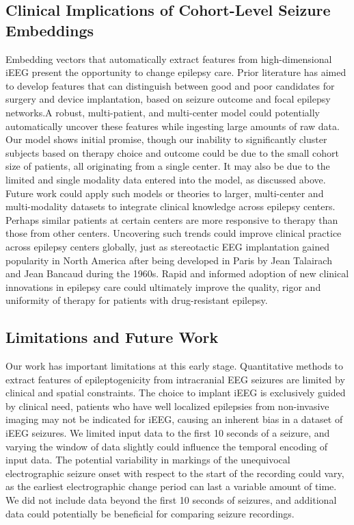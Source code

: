 \documentclass[11pt]{article}
\begin{document}
\subsection*{Clinical Implications of Cohort-Level Seizure Embeddings}
Embedding vectors that automatically extract features from high-dimensional iEEG present the opportunity to change epilepsy care. Prior literature has aimed to develop features that can distinguish between good and poor candidates for surgery and device implantation, based on seizure outcome and focal epilepsy networks\cite{Gallagher2023Quantifying,Bernabei2022Normative, Jaber2024spatial, Sinha2017Predicting,Li2021Neural, ScheidIntracranial, Khambhati2021Long}.A robust, multi-patient, and multi-center model could potentially automatically uncover these features while ingesting large amounts of raw data\cite{Bernabei2023Quantitative,Litt2022Engineers}. Our model shows initial promise, though our inability to significantly cluster subjects based on therapy choice and outcome could be due to the small cohort size of patients, all originating from a single center. It may also be due to the limited and single modality data entered into the model, as discussed above. Future work could apply such models or theories to larger, multi-center and multi-modality datasets to integrate clinical knowledge across epilepsy centers. Perhaps similar patients at certain centers are more responsive to therapy than those from other centers. Uncovering such trends could improve clinical practice across epilepsy centers globally, just as stereotactic EEG implantation gained popularity in North America after being developed in Paris by Jean Talairach and Jean Bancaud during the 1960s\cite{Youngerman2019Stereoelectroencephalography}. Rapid and informed adoption of new clinical innovations in epilepsy care could ultimately improve the quality, rigor and uniformity of therapy for patients with drug-resistant epilepsy.

\subsection*{Limitations and Future Work}
Our work has important limitations at this early stage. Quantitative methods to extract features of epileptogenicity from intracranial EEG seizures are limited by clinical and spatial constraints. The choice to implant iEEG is exclusively guided by clinical need, patients who have well localized epilepsies from non-invasive imaging may not be indicated for iEEG, causing an inherent bias in a dataset of iEEG seizures. We limited input data to the first 10 seconds of a seizure, and varying the window of data slightly could influence the temporal encoding of input data. The potential variability in markings of the unequivocal electrographic seizure onset with respect to the start of the recording could vary, as the earliest electrographic change period can last a variable amount of time\cite{Litt2001Epileptic}. We did not include data beyond the first 10 seconds of seizures, and additional data could potentially be beneficial for comparing seizure recordings. 
\end{document}
